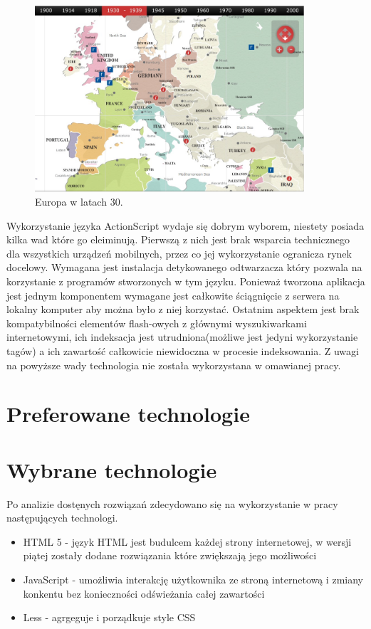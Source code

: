 \begin{figure}[H]
  \centering
    \includegraphics[width=100mm]{ge/archives.jpg}
  \caption{Europa w latach 30.}
  \label{fig:flasheurope}
\end{figure}


Wykorzystanie języka ActionScript wydaje się dobrym wyborem, niestety posiada kilka wad które go eleiminują. Pierwszą z nich jest brak wsparcia technicznego dla wszystkich urządzeń mobilnych, przez co jej wykorzystanie ogranicza rynek docelowy.
Wymagana jest instalacja detykowanego odtwarzacza który pozwala na korzystanie z programów stworzonych w tym języku.
Ponieważ tworzona aplikacja jest jednym komponentem wymagane jest całkowite ściągnięcie z serwera na lokalny komputer aby można było z niej korzystać. Ostatnim aspektem jest brak kompatybilności elementów flash-owych z głównymi wyszukiwarkami internetowymi, ich indeksacja jest utrudniona(możliwe jest jedyni wykorzystanie tagów) a ich zawartość całkowicie niewidoczna w procesie indeksowania. Z uwagi na powyższe wady technologia nie została wykorzystana w omawianej pracy.

\section{Preferowane technologie}
\label{sec:pref}

\section{Wybrane technologie}
\label{sec:technologie}

Po analizie dostęnych rozwiązań zdecydowano się na wykorzystanie w pracy następujących technologi.
\begin{itemize}

\item
HTML 5 - język HTML jest budulcem każdej strony internetowej, w wersji piątej zostały dodane rozwiązania które zwiększają jego możliwości

\item
JavaScript - umożliwia interakcję użytkownika ze stroną internetową  i zmiany konkentu bez konieczności odświeżania całej zawartości

\item
Less - agrgeguje i porządkuje style CSS

\end{itemize}
